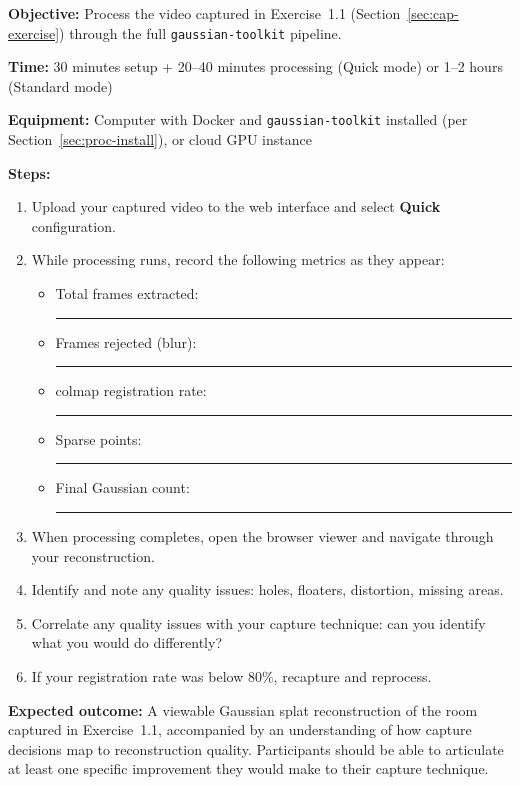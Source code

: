 \begin{tcolorbox}[
  enhanced,
  colback=SuccessGreen!8,
  colframe=SuccessGreen,
  fonttitle=\bfseries\sffamily,
  title={Exercise 2.1: Pipeline Processing},
  sharp corners=south,
  boxrule=0.6pt
]
\textbf{Objective:} Process the video captured in Exercise~1.1 (Section~\ref{sec:cap-exercise}) through the full \texttt{gaussian-toolkit} pipeline.

\textbf{Time:} 30 minutes setup + 20--40 minutes processing (Quick mode) or 1--2 hours (Standard mode)

\textbf{Equipment:} Computer with Docker and \texttt{gaussian-toolkit} installed (per Section~\ref{sec:proc-install}), or cloud GPU instance

\textbf{Steps:}
\begin{enumerate}
  \item Upload your captured video to the web interface and select \textbf{Quick} configuration.
  \item While processing runs, record the following metrics as they appear:
    \begin{itemize}
      \item Total frames extracted: \rule{3cm}{0.4pt}
      \item Frames rejected (blur): \rule{3cm}{0.4pt}
      \item \acrshort{colmap} registration rate: \rule{3cm}{0.4pt}
      \item Sparse points: \rule{3cm}{0.4pt}
      \item Final Gaussian count: \rule{3cm}{0.4pt}
    \end{itemize}
  \item When processing completes, open the browser viewer and navigate through your reconstruction.
  \item Identify and note any quality issues: holes, floaters, distortion, missing areas.
  \item Correlate any quality issues with your capture technique: can you identify what you would do differently?
  \item If your registration rate was below 80\%, recapture and reprocess.
\end{enumerate}

\textbf{Expected outcome:} A viewable Gaussian splat reconstruction of the room captured in Exercise~1.1, accompanied by an understanding of how capture decisions map to reconstruction quality. Participants should be able to articulate at least one specific improvement they would make to their capture technique.
\end{tcolorbox}

